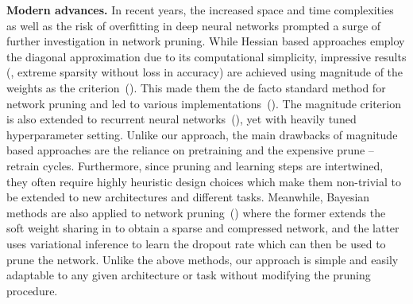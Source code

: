 \textbf{Modern advances.}\quad
In recent years, the increased space and time complexities as well as the risk of overfitting in deep neural networks prompted a surge of further investigation in network pruning.
While Hessian based approaches employ the diagonal approximation due to its computational simplicity, impressive results (\ie, extreme sparsity without loss in accuracy) are achieved using magnitude of the weights as the criterion~(\cite{han2015learning}).
This made them the de facto standard method for network pruning and led to various implementations~(\cite{guo2016dynamic, Carreira-Perpiñán_2018_CVPR}).
The magnitude criterion is also extended to recurrent neural networks~(\cite{narang2017exploring}), yet with heavily tuned hyperparameter setting.
Unlike our approach, the main drawbacks of magnitude based approaches are the reliance on pretraining and the expensive prune -- retrain cycles.
Furthermore, since pruning and learning steps are intertwined, they often require highly heuristic design choices which make them non-trivial to be extended to new architectures and different tasks.
Meanwhile, Bayesian methods are also applied to network pruning~(\cite{ullrich2017soft, molchanov2017variational}) where the former extends the soft weight sharing in \cite{nowlan1992simplifying} to obtain a sparse and compressed network, and the latter uses variational inference to learn the dropout rate which can then be used to prune the network.
Unlike the above methods, our approach is simple and easily adaptable to any given architecture or task without modifying the pruning procedure.

